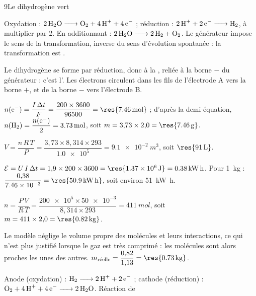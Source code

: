 

\begin{corrigeBac}{9}{Le dihydrogène vert}
\begin{questions}
\item Oxydation : $\ce{2H2O -> O2 + 4H+ + 4e-}$ ; réduction : $\ce{2H+ + 2e- -> H2}$, à multiplier par 2. En additionnant :
$\ce{2H2O -> 2H2 + O2}$. Le générateur impose le sens de la transformation, inverse du sens d'évolution spontanée :
la transformation est . \pts{1 pt}
\item Le dihydrogène se forme par réduction, donc à la , reliée à la borne $-$ du générateur : c'est
l'. Les électrons circulent dans les fils de l'électrode A vers la borne $+$, et de la borne $-$ vers
l'électrode B. 
\item $n(\mathrm{e}^-)=\dfrac{I\,\Delta t}{F}=\dfrac{200\times3600}{96500}=\res{\qty{7,46}{mol}}$ ; d'après la demi-équation,
$n(\ce{H2})=\dfrac{n(\mathrm{e}^-)}{2}=\qty{3,73}{mol}$, soit $m=3{,}73\times2{,}0=\res{\qty{7,46}{g}}$. \pts{1 pt}
\item $V=\dfrac{n\,R\,T}{P}=\dfrac{3{,}73\times8{,}314\times293}{\num{1.0e5}}=\qty{9.1e-2}{m^3}$, soit $\res{\qty{91}{L}}$. 
\item $\mathcal{E}=U\,I\,\Delta t=1{,}9\times200\times3600=\res{\qty{1,37e6}{J}}=\qty{0,38}{kW.h}$. Pour \qty{1}{kg} :
$\dfrac{0{,}38}{\num{7.46e-3}}=\res{\qty{50,9}{kW.h}}$, soit environ \qty{51}{kW.h}. \pts{1 pt}
\end{questions}
\begin{questions}[resume]
\item $n=\dfrac{P\,V}{R\,T}=\dfrac{\num{200e5}\times\num{50e-3}}{8{,}314\times293}=\qty{411}{mol}$, soit $m=411\times2{,}0=\res{\qty{0,82}{kg}}$. 
\item Le modèle néglige le volume propre des molécules et leurs interactions, ce qui n'est plus justifié lorsque le gaz
est très comprimé : les molécules sont alors proches les unes des autres. $m_\text{réelle}=\dfrac{0{,}82}{1{,}13}=\res{\qty{0,73}{kg}}$. 
\end{questions}
\begin{questions}[resume]
\item Anode (oxydation) : $\ce{H2 -> 2H+ + 2e-}$ ; cathode (réduction) : $\ce{O2 + 4H+ + 4e- -> 2H2O}$. Réaction de

\end{questions}
\end{corrigeBac}
